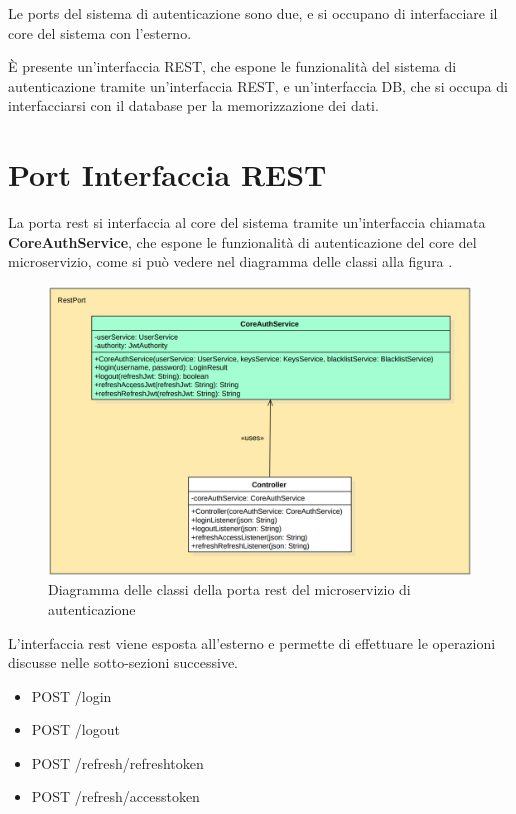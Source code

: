 Le ports del sistema di autenticazione sono due, e si occupano di interfacciare il core del sistema con l'esterno.

È presente un'interfaccia REST, che espone le funzionalità del sistema di autenticazione tramite un'interfaccia REST, e un'interfaccia DB, che si occupa di interfacciarsi con il database per la memorizzazione dei dati.

\section{Port Interfaccia REST}

La porta rest si interfaccia al core del sistema tramite un'interfaccia chiamata \textbf{CoreAuthService}, che espone le funzionalità di autenticazione del core del microservizio, come si può vedere nel diagramma delle classi alla figura .
\begin{figure}[ht]
    \centering
    \includegraphics[width=\textwidth]{img/classi_portrest.png}
    \caption{Diagramma delle classi della porta rest del microservizio di autenticazione}
    \label{fig:classi_portrest}
\end{figure}

L'interfaccia rest viene esposta all'esterno e permette di effettuare le operazioni discusse nelle sotto-sezioni successive.

\begin{itemize}
    \item POST /login
    \item POST /logout
    \item POST /refresh/refreshtoken
    \item POST /refresh/accesstoken
\end{itemize}

